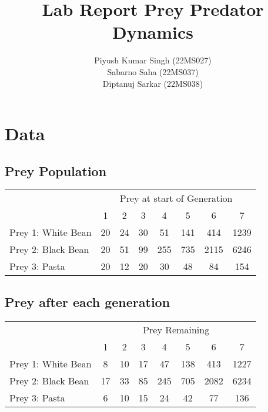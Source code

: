 \documentclass{scrartcl}
\title{Lab Report Prey Predator Dynamics}
\author{Piyush Kumar Singh (22MS027)\\Sabarno Saha (22MS037)\\Diptanuj Sarkar (22MS038)}
\date{}
\begin{document}
\maketitle
\tableofcontents
\newpage

\section{Data}

\subsection{Prey Population}
\begin{table}[H]
    \centering
    \begin{tabular}{|l|c|c|c|c|c|c|c|}
        \hline
        {} & \multicolumn{7}{c|}{Prey at start of Generation} \\
        \cline{2-8}
        {} & 1 & 2 & 3 & 4 & 5 & 6 & 7 \\
        \hline \hline
        Prey 1: White Bean & 20 & 24 & 30 & 51 & 141 & 414 & 1239\\ 
        \hline
        Prey 2: Black Bean & 20 & 51 & 99 & 255 & 735 & 2115 & 6246\\
        \hline
        Prey 3: Pasta & 20 & 12 & 20 & 30 & 48 & 84 & 154\\
        \hline
    \end{tabular}
\end{table}


\subsection{Prey after each generation}
\begin{table}[H]
    \centering
    \begin{tabular}{|l|c|c|c|c|c|c|c|}
        \hline
        {} & \multicolumn{7}{c|}{Prey Remaining} \\
        \cline{2-8}
        {} & 1 & 2 & 3 & 4 & 5 & 6 & 7 \\
        \hline \hline
        Prey 1: White Bean & 8 & 10 & 17 & 47 & 138 & 413 & 1227\\ 
        \hline
        Prey 2: Black Bean & 17 & 33 & 85 & 245 & 705 & 2082 & 6234\\
        \hline
        Prey 3: Pasta & 6 & 10 & 15 & 24 & 42 & 77 & 136\\
        \hline
    \end{tabular}
\end{table}
\end{document}
